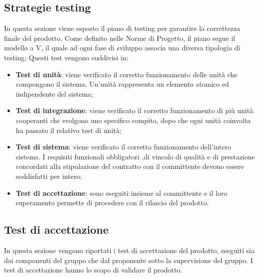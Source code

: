 \subsection{Strategie testing}
In questa sezione viene esposto il piano di testing per garantire la correttezza finale del prodotto. 
Come definito nelle Norme di Progetto, il piano segue il modello a V, il quale ad ogni fase di sviluppo associa una diversa tipologia di testing; Questi test vengono suddivisi in:

\begin{itemize}
	\item \textbf{Test di unità}: viene verificato il corretto funzionamento delle unità che compongono il sistema. Un'unità rappresenta un elemento atomico ed indipendente del sistema;
	\item \textbf{Test di integrazione}: viene verificato il corretto funzionamento di più unità cooperanti che svolgono uno specifico compito, dopo che ogni unità coinvolta ha passato il relativo test di unità;
	\item \textbf{Test di sistema}: viene verificato il corretto funzionamento dell'intero sistema. I requisiti funzionali obbligatori ,di vincolo di qualità e di prestazione concordati alla stipulazione del contratto con il committente devono essere soddisfatti per intero;
	\item \textbf{Test di accettazione}: sono eseguiti insieme al  committente e il loro superamento permette di procedere con il rilascio del prodotto. 
\end{itemize}

\subsection{Test di accettazione}

In questa sezione vengono riportati i test di accettazione del prodotto, eseguiti sia dai componenti del gruppo che dal proponente sotto la supervisione del gruppo. I test di accettazione hanno lo scopo di validare il prodotto.

